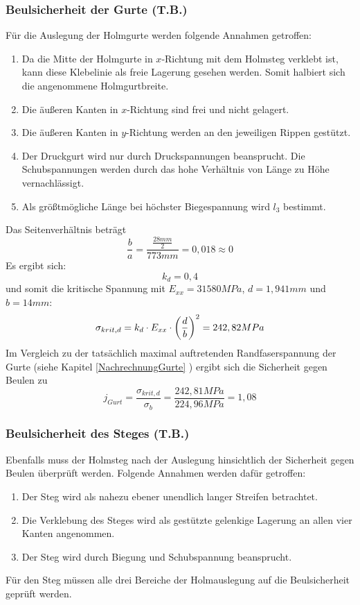 \subsubsection{Beulsicherheit der Gurte (T.B.)}
Für die Auslegung der Holmgurte werden folgende Annahmen getroffen:
\begin{enumerate}
	\item Da die Mitte der Holmgurte in $x$-Richtung mit dem Holmsteg verklebt ist, kann diese Klebelinie als freie Lagerung gesehen werden. Somit halbiert sich die angenommene Holmgurtbreite.
	\item Die äußeren Kanten in $x$-Richtung sind frei und nicht gelagert.
	\item Die äußeren Kanten in $y$-Richtung werden an den jeweiligen Rippen gestützt.
	\item Der Druckgurt wird nur durch Druckspannungen beansprucht. Die Schubspannungen werden durch das hohe Verhältnis von Länge zu  Höhe vernachlässigt.
	\item Als größtmögliche Länge bei höchster Biegespannung wird $l_{3}$ bestimmt.
\end{enumerate}
Das Seitenverhältnis beträgt 
\begin{equation}
	\frac{b}{a}=\frac{\frac{28 mm}{2}}{773 mm}=0,018 \approx 0
\end{equation}
\noindent Es ergibt sich:
\begin{equation}
	k_{d}=0,4
\end{equation}
und somit die kritische Spannung mit $E_{xx}=31580MPa$, $d=1,941mm$ und $b=14mm$:
\begin{equation}
	\sigma_{krit,d}=k_{d}\cdot E_{xx}\cdot\biggl(\frac{d}{b}\biggr)^{2}\\
	= 242,82 MPa
\end{equation}
Im Vergleich zu der tatsächlich maximal auftretenden Randfaserspannung der Gurte (siehe Kapitel \ref{NachrechnungGurte} ) ergibt sich die Sicherheit gegen Beulen zu 
\begin{equation}
	j_{Gurt}=\frac{\sigma_{krit,d}}{\sigma_{b}}=\frac{242,81 MPa}{224,96 MPa}=1,08
\end{equation}


\subsubsection{Beulsicherheit des Steges (T.B.)}
\label{Beulsicherheit Steg}
Ebenfalls muss der Holmsteg nach der Auslegung hinsichtlich der Sicherheit gegen Beulen überprüft werden. Folgende Annahmen werden dafür getroffen:\\
\begin{enumerate}
	\item Der Steg wird als nahezu ebener unendlich langer Streifen betrachtet.
	\item Die Verklebung des Steges wird als gestützte gelenkige Lagerung an allen vier Kanten angenommen.
	\item Der Steg wird durch Biegung und Schubspannung beansprucht.
\end{enumerate}
Für den Steg müssen alle drei Bereiche der Holmauslegung auf die Beulsicherheit geprüft werden. \\

